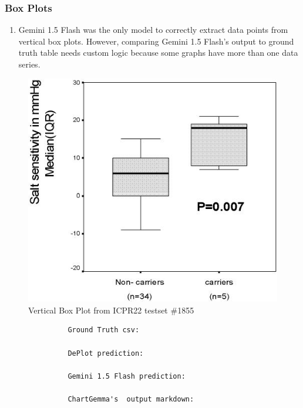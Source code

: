 \documentclass[
	letterpaper, %
]{jdf}
\begin{document}
\subsubsection{Box Plots}\label{sssect:box}
\begin{enumerate}
         \item Gemini 1.5 Flash was the only model to correctly extract data points from vertical box plots.
             However, comparing Gemini 1.5 Flash's output to ground truth table needs custom logic because some graphs have more than one data series.
              \end{enumerate}
              \begin{figure}
                   \includegraphics{test-sample/icpr22/images/vertical-box/PMC1855992___g001.jpg}
                   \caption{Vertical Box Plot from ICPR22 testset \#1855}
                   \label{fig:icpr22-box-185}
                    \end{figure}
               \begin{verbatim}
               Ground Truth csv:
               
               DePlot prediction:
               
               Gemini 1.5 Flash prediction:
               
               ChartGemma's  output markdown:
               
               \end{verbatim}
\end{document}
